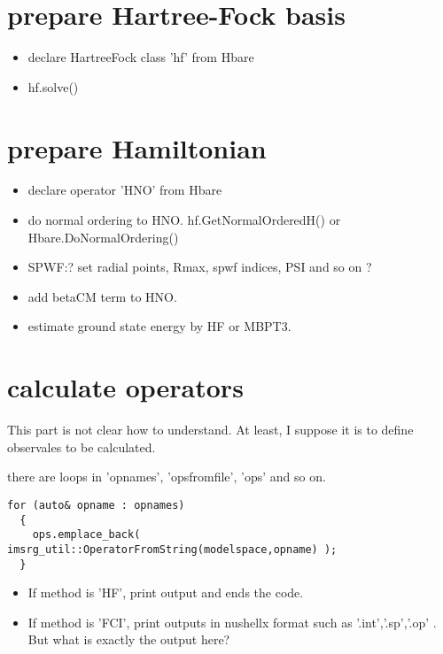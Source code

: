 \section{prepare Hartree-Fock basis}
\begin{itemize}
  \item declare HartreeFock class 'hf' from Hbare
  \item hf.solve() 
\end{itemize} 
\section{prepare Hamiltonian}
\begin{itemize}
  \item declare operator 'HNO' from Hbare 
  \item do normal ordering to HNO. 
        hf.GetNormalOrderedH() or Hbare.DoNormalOrdering() 
  \item SPWF:? set radial points, Rmax, spwf indices, PSI and so on ?
  \item add betaCM term to HNO. 
  \item estimate ground state energy by HF or MBPT3. 
\end{itemize} 
\section{calculate operators} 
This part is not clear how to understand. 
 At least, I suppose it is to define observales to be calculated.   

there are loops in 'opnames', 'opsfromfile', 'ops' and so on. 
  \begin{lstlisting}[frame=single]
   for (auto& opname : opnames)
  {
    ops.emplace_back( imsrg_util::OperatorFromString(modelspace,opname) );
  }
  \end{lstlisting}
\begin{itemize}
  \item If method is 'HF', print output and ends the code. 
  \item If method is 'FCI', print outputs in nushellx format
        such as '.int','.sp','.op' .
        But what is exactly the output here? 
\end{itemize} 

